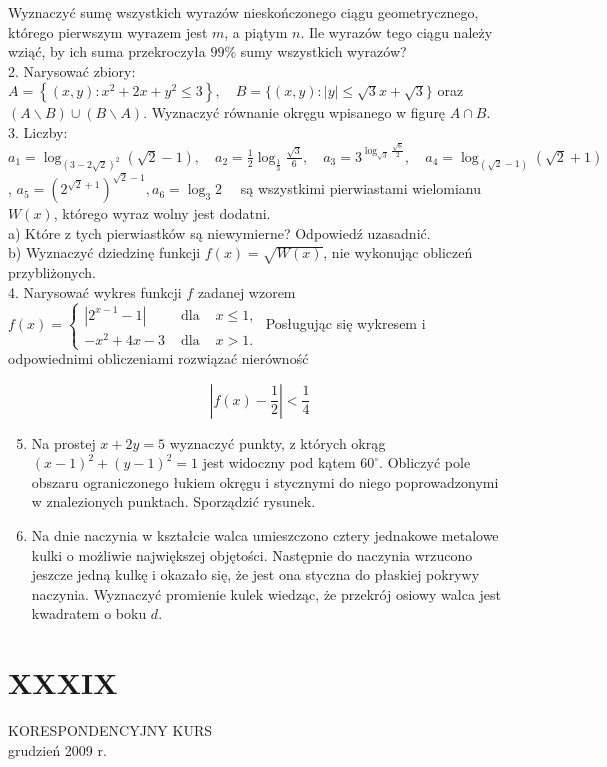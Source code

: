 \documentclass[10pt]{article}
\begin{document}
Wyznaczyć sumę wszystkich wyrazów nieskończonego ciągu geometrycznego, którego pierwszym wyrazem jest $m$, a piątym $n$. Ile wyrazów tego ciągu należy wziąć, by ich suma przekroczyła $99 \%$ sumy wszystkich wyrazów?\\
2. Narysować zbiory: $A=\left\{(x, y): x^{2}+2 x+y^{2} \leqslant 3\right\}, \quad B=\{(x, y):|y| \leqslant \sqrt{3} x+\sqrt{3}\}$ oraz $(A \backslash B) \cup(B \backslash A)$. Wyznaczyć równanie okręgu wpisanego w figurę $A \cap B$.\\
3. Liczby: $a_{1}=\log _{(3-2 \sqrt{2})^{2}}(\sqrt{2}-1), \quad a_{2}=\frac{1}{2} \log _{\frac{1}{3}} \frac{\sqrt{3}}{6}, \quad a_{3}=3^{\log _{\sqrt{3}} \frac{\sqrt{6}}{2}}, \quad a_{4}=\log _{(\sqrt{2}-1)}(\sqrt{2}+1)$, $a_{5}=\left(2^{\sqrt{2}+1}\right)^{\sqrt{2}-1}, a_{6}=\log _{3} 2 \quad$ są wszystkimi pierwiastami wielomianu $W(x)$, którego wyraz wolny jest dodatni.\\
a) Które z tych pierwiastków są niewymierne? Odpowiedź uzasadnić.\\
b) Wyznaczyć dziedzinę funkcji $f(x)=\sqrt{W(x)}$, nie wykonując obliczeń przybliżonych.\\
4. Narysować wykres funkcji $f$ zadanej wzorem $f(x)=\left\{\begin{array}{lll}\left|2^{x-1}-1\right| & \text { dla } & x \leqslant 1, \\ -x^{2}+4 x-3 & \text { dla } & x>1 .\end{array}\right.$ Posługując się wykresem i odpowiednimi obliczeniami rozwiązać nierówność

$$
\left|f(x)-\frac{1}{2}\right|<\frac{1}{4}
$$

\begin{enumerate}
  \setcounter{enumi}{4}
  \item Na prostej $x+2 y=5$ wyznaczyć punkty, z których okrąg $(x-1)^{2}+(y-1)^{2}=1$ jest widoczny pod kątem $60^{\circ}$. Obliczyć pole obszaru ograniczonego łukiem okręgu i stycznymi do niego poprowadzonymi w znalezionych punktach. Sporządzić rysunek.
  \item Na dnie naczynia w kształcie walca umieszczono cztery jednakowe metalowe kulki o możliwie największej objętości. Następnie do naczynia wrzucono jeszcze jedną kulkę i okazało się, że jest ona styczna do płaskiej pokrywy naczynia. Wyznaczyć promienie kulek wiedząc, że przekrój osiowy walca jest kwadratem o boku $d$.
\end{enumerate}

\section*{XXXIX}
KORESPONDENCYJNY KURS\\
grudzień 2009 r.
\end{document}
